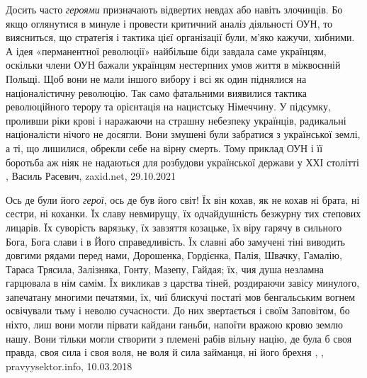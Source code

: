 Досить часто \emph{героями} призначають відвертих невдах або навіть злочинців. Бо якщо
оглянутися в минуле і провести критичний аналіз діяльності ОУН, то виясниться,
що стратегія і тактика цієї організації були, м’яко кажучи, хибними. А ідея
«перманентної революції» найбільше біди завдала саме українцям, оскільки члени
ОУН бажали українцям нестерпних умов життя в міжвоєнній Польщі. Щоб вони не
мали іншого вибору і всі як один піднялися на націоналістичну революцію. Так
само фатальними виявилися тактика революційного терору та орієнтація на
нацистську Німеччину. У підсумку, проливши ріки крові і наражаючи на страшну
небезпеку українців, радикальні націоналісти нічого не досягли. Вони змушені
були забратися з української землі, а ті, що лишилися, обрекли себе на вірну
смерть. Тому приклад ОУН і її боротьба аж ніяк не надаються для розбудови
української держави у ХХІ столітті
, 
Василь Расевич, zaxid.net, 29.10.2021

Ось де були його \emph{герої}, ось де був його світ! Їх він кохав, як не кохав
ні брата, ні сестри, ні коханки. Їх славу невмирущу, їх одчайдушність безжурну
тих степових лицарів. Їх суворість варязьку, їх завзяття козацьке, їх віру
гарячу в сильного Бога, Бога слави і в Його справедливість. Їх славні або
замучені тіні виводить довгими рядами перед нами, Дорошенка, Гордієнка, Палія,
Швачку, Гамалію, Тараса Трясила, Залізняка, Гонту, Мазепу, Гайдая; їх, чия душа
незламна гарцювала в нім самім. Їх викликав з царства тіней, роздираючи завісу
минулого, запечатану многими печатями, їх, чиї блискучі постаті мов
бенгальським вогнем освічували тьму і неволю сучасности. До них звертається і
своїм Заповітом, бо ніхто, лиш вони могли пірвати кайдани ганьби, напоїти
вражою кровю землю нашу. Вони тільки могли створити з племені рабів вільну
націю, де була б своя правда, своя сила і своя воля, не воля й сила займанця,
ні його брехня
, , pravyysektor.info, 10.03.2018
